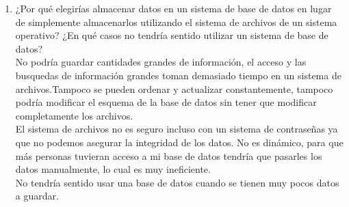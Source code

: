 \documentclass[12pt]{article}
\begin{document}
\begin{enumerate}
	\item ¿Por qué elegirías almacenar datos en un sistema de base
	 de datos en lugar de simplemente almacenarlos utilizando el
	 sistema de archivos de un sistema operativo? ¿En qué casos no
	 tendría sentido utilizar un sistema de base de datos?\\
	 
	 No podría guardar cantidades grandes de información, el acceso
	 y las busquedas de información grandes	toman demasiado tiempo
	 en un sistema de archivos.Tampoco se pueden ordenar y actualizar
	 constantemente, tampoco podría modificar el esquema de la base
	 de datos sin tener que modificar completamente los archivos.\\
	 El sistema de archivos no es seguro incluso con un sistema
	 de contraseñas ya que no podemos asegurar la integridad de los
	 datos. No es dinámico, para que más personas tuvieran acceso a
	 mi base de datos tendría que pasarles los datos manualmente, lo cual es muy ineficiente.\\
	 No tendría sentido usar una base de datos cuando se tienen muy 
	 pocos datos a guardar.
	 

\end{enumerate}
\end{document}
